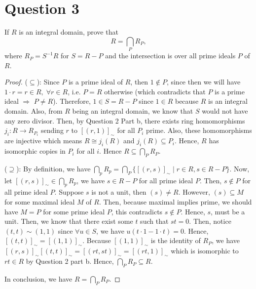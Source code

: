 \section{Question 3}

\begin{question}
    If $R$ is an integral domain, prove that
    $$
    R=\bigcap_P R_P,
    $$
    where $R_P=S^{-1} R$ for $S=R-P$ and the intersection is over all prime ideals $P$ of $R$.
\end{question}

\begin{answer}
    \begin{proof}
        ($\subseteq$): Since $P$ is a prime ideal of $R$, then $1 \notin P$, since then we will have $1 \cdot r = r \in R, \; \forall r \in R$, i.e. $P = R$ otherwise (which contradicts that $P$ is a prime ideal $\Rightarrow$ $P \neq R$). Therefore, $1 \in S = R - P$ since $1 \in R$ because $R$ is an integral domain. Also, from $R$ being an integral domain, we know that $S$ would not have any zero divisor. Then, by Question 2 Part b, there exists ring homomorphisms $j_i: R \to R_{P_i}$ sending $r$ to $[(r,1)]_{\sim}$ for all $P_i$ prime. Also, these homomorphisms are injective which means $R \cong j_i(R)$ and $j_i(R) \subseteq P_i$. Hence, $R$ has isomorphic copies in $P_i$ for all $i$. Hence $R \subseteq \bigcap_P R_P$.
        
        ($\supseteq$): By definition, we have $\bigcap_p R_p = \bigcap_P \{[(r,s)]_{\sim} \mid r \in R, s \in R-P\}$. Now, let $[(r,s)]_{\sim} \in \bigcap_p R_p$, we have $s \in R - P$ for all prime ideal $P$. Then, $s \notin P$ for all prime ideal $P$. Suppose $s$ is not a unit, then $(s) \neq R$. However, $(s) \subseteq M$ for some maximal ideal $M$ of $R$. Then, because maximal implies prime, we should have $M = P$ for some prime ideal $P$, this contradicts $s \notin P$. Hence, $s$, must be a unit. Then, we know that there exist some $t$ such that $st = 0$. Then, notice $(t,t) \sim (1,1)$ since $\forall u \in S$, we have $u(t\cdot 1 - 1 \cdot t) = 0$. Hence, $[(t,t)]_{\sim} = [(1,1)]_{\sim}$. Because $[(1,1)]_{\sim}$ is the identity of $R_P$, we have $[(r,s)]_{\sim}[(t,t)]_{\sim} = [(rt, st)]_{\sim} = [(rt,1)]_{\sim}$ which is isomorphic to $rt \in R$ by Question 2 part b. Hence, $\bigcap_P R_P \subseteq R$.
        
        In conclusion, we have $R = \bigcap_P R_P$.
    \end{proof}
\end{answer}